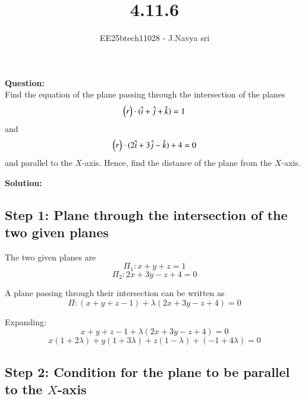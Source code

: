 \documentclass[journal]{IEEEtran}
\begin{document}

\vspace{3cm}

\title{4.11.6}
\author{EE25btech11028 - J.Navya sri}
{\let\newpage\relax\maketitle}


\textbf{Question:} \\
   Find the equation of the plane passing through the intersection of the planes 
\[
\begin{pmatrix}r\end{pmatrix} \cdot (\hat{i} + \hat{j} + \hat{k}) = 1
\]
and 
\[
\begin{pmatrix}r\end{pmatrix} \cdot (2\hat{i} + 3\hat{j} - \hat{k}) + 4 = 0
\]
and parallel to the $X$-axis. Hence, find the distance of the plane from the $X$-axis.
 
\bigskip
\textbf{Solution:}

\subsection*{Step 1: Plane through the intersection of the two given planes}

The two given planes are
\begin{equation}
\Pi_1: x + y + z = 1
\end{equation}
\begin{equation}
\Pi_2: 2x + 3y - z + 4 = 0
\end{equation}

A plane passing through their intersection can be written as
\begin{equation}
\Pi: (x + y + z - 1) + \lambda (2x + 3y - z + 4) = 0
\end{equation}

Expanding:
\begin{equation}
x + y + z - 1 + \lambda(2x + 3y - z + 4) = 0
\end{equation}
\begin{equation}
x(1 + 2\lambda) + y(1 + 3\lambda) + z(1 - \lambda) + (-1 + 4\lambda) = 0
\end{equation}

\subsection*{Step 2: Condition for the plane to be parallel to the $X$-axis}
\end{document}
